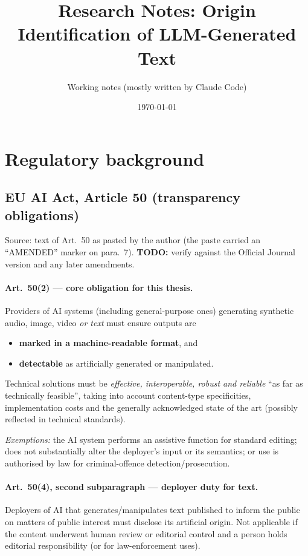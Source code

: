 \documentclass[10pt,a4paper,twocolumn]{article}
\title{Research Notes: Origin Identification of LLM-Generated Text}
\author{Working notes (mostly written by Claude Code)}
\date{\today}
\begin{document}
\maketitle
\tableofcontents

\section{Regulatory background}

\subsection{EU AI Act, Article 50 (transparency obligations)}
Source: text of Art.~50 as pasted by the author (the paste carried an ``AMENDED'' marker on para.~7).
\textbf{TODO:} verify against the Official Journal version and any later amendments.

\paragraph{Art.~50(2) --- core obligation for this thesis.}
Providers of AI systems (including general-purpose ones) generating synthetic audio, image, video \emph{or text} must ensure outputs are
\begin{itemize}
  \item \textbf{marked in a machine-readable format}, and
  \item \textbf{detectable} as artificially generated or manipulated.
\end{itemize}
Technical solutions must be \emph{effective, interoperable, robust and reliable} ``as far as technically feasible'', taking into account content-type specificities, implementation costs and the generally acknowledged state of the art (possibly reflected in technical standards).

\emph{Exemptions:} the AI system performs an assistive function for standard editing; does not substantially alter the deployer's input or its semantics; or use is authorised by law for criminal-offence detection/prosecution.

\paragraph{Art.~50(4), second subparagraph --- deployer duty for text.}
Deployers of AI that generates/manipulates text published to inform the public on matters of public interest must disclose its artificial origin. Not applicable if the content underwent human review or editorial control and a person holds editorial responsibility (or for law-enforcement uses).
\end{document}

